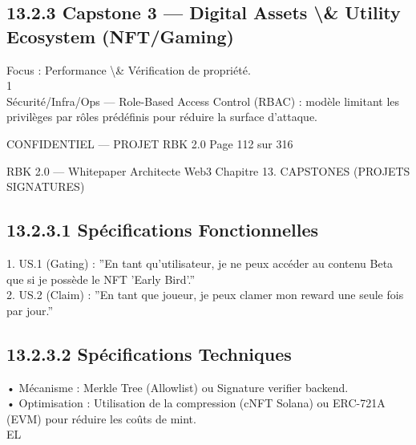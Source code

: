 \subsection{13.2.3 Capstone 3 — Digital Assets \textbackslash{}& Utility Ecosystem (NFT/Gaming)}
Focus : Performance \textbackslash{}& Vérification de propriété.\\
1\\
Sécurité/Infra/Ops — Role-Based Access Control (RBAC) : modèle limitant les privilèges par rôles prédéfinis pour réduire la surface d’attaque.\\
\vspace{0.5em}
\vspace{0.5em}
\vspace{0.5em}
\vspace{0.5em}
\begin{confidential}CONFIDENTIEL — PROJET RBK 2.0                                             Page 112 sur 316\end{confidential}
RBK 2.0 — Whitepaper Architecte Web3                                                     Chapitre 13. CAPSTONES (PROJETS SIGNATURES)\\
\vspace{0.5em}
\vspace{0.5em}
\subsection{13.2.3.1 Spécifications Fonctionnelles}
\vspace{0.5em}
1. US.1 (Gating) : ”En tant qu’utilisateur, je ne peux accéder au contenu Beta que si je possède le NFT ’Early Bird’.”\\
\vspace{0.5em}
2. US.2 (Claim) : ”En tant que joueur, je peux clamer mon reward une seule fois par jour.”\\
\vspace{0.5em}
\subsection{13.2.3.2 Spécifications Techniques}
\vspace{0.5em}
• Mécanisme : Merkle Tree (Allowlist) ou Signature verifier backend.\\
\vspace{0.5em}
• Optimisation : Utilisation de la compression (cNFT Solana) ou ERC-721A (EVM) pour réduire les coûts de mint.\\
\vspace{0.5em}
\vspace{0.5em}
\vspace{0.5em}
\vspace{0.5em}
EL\\
